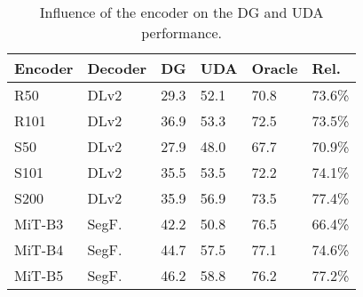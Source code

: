 \documentclass[journal,compsoc]{IEEEtran}
\begin{document}
\begin{table}
\centering
\caption{Influence of the encoder on the DG and UDA performance.}
\label{tab:encoder_size}
\footnotesize
\begin{tabular}{llllll}
\toprule
Encoder & Decoder &       DG &           UDA &         Oracle &   Rel. \\
\midrule
    R50~\cite{he2016deep} &    DLv2~\cite{chen2017deeplab} &     29.3 & 52.1 &   70.8 & 73.6\% \\
    R101~\cite{he2016deep} &    DLv2~\cite{chen2017deeplab} &     36.9 & 53.3 &   72.5 & 73.5\% \\
    S50~\cite{zhang2020resnest} &    DLv2~\cite{chen2017deeplab} &     27.9 & 48.0 &   67.7 & 70.9\% \\
    S101~\cite{zhang2020resnest} &    DLv2~\cite{chen2017deeplab} &     35.5 & 53.5 &   72.2 & 74.1\% \\
    S200~\cite{zhang2020resnest} &    DLv2~\cite{chen2017deeplab} &     35.9 & 56.9 &   73.5 & 77.4\% \\
    MiT-B3~\cite{xie2021segformer} &   SegF.~\cite{xie2021segformer} &     42.2 & 50.8 &   76.5 & 66.4\% \\
    MiT-B4~\cite{xie2021segformer} &   SegF.~\cite{xie2021segformer} &     44.7 & 57.5 &   77.1 & 74.6\% \\
    MiT-B5~\cite{xie2021segformer} &   SegF.~\cite{xie2021segformer} &     46.2 & 58.8 &   76.2 & 77.2\% \\
\bottomrule
\end{tabular}
\end{table} 
\end{document}

